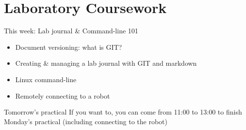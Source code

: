 \documentclass[compress]{beamer}
\begin{document}
\section[Labs]{Laboratory Coursework}

\begin{frame}{This week: Lab journal \& Command-line 101}
    \begin{itemize}
        \item Document versioning: what is GIT?
        \item Creating \& managing a lab journal with GIT and markdown
        \item Linux command-line
        \item Remotely connecting to a robot
    \end{itemize}

    \begin{exampleblock}{Tomorrow's practical}
        If you want to, you can come from 11:00 to 13:00 to finish Monday's
        practical (including connecting to the robot)
    \end{exampleblock}



\end{frame}
\end{document}
